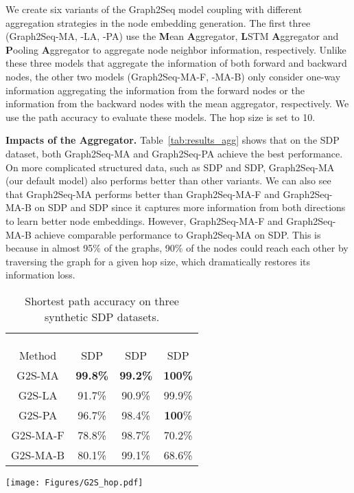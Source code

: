 \documentclass{article} \usepackage{iclr2019_conference,times}
\begin{document}
We create six variants of the Graph2Seq model coupling with different aggregation strategies in the node embedding generation. The first three (Graph2Seq-MA, -LA, -PA) use the \textbf{M}ean \textbf{A}ggregator, \textbf{L}STM \textbf{A}ggregator and \textbf{P}ooling \textbf{A}ggregator
to aggregate node neighbor information, respectively.
Unlike these three models that aggregate the information of both forward and backward nodes,
the other two models (Graph2Seq-MA-F, -MA-B) only consider one-way information aggregating the information from the forward nodes or the information from the backward nodes with the mean aggregator, respectively. We use the path accuracy to evaluate these models. The hop size is set to 10. 

\textbf{Impacts of the Aggregator.} Table~\ref{tab:results_agg} shows that on the SDP dataset, both Graph2Seq-MA and Graph2Seq-PA achieve the best performance.
On more complicated structured data, such as SDP and SDP, Graph2Seq-MA (our default model) also performs better than other variants.
We can also see that Graph2Seq-MA performs better than Graph2Seq-MA-F and Graph2Seq-MA-B on SDP and SDP since it captures more information from both directions to learn better node embeddings. However, Graph2Seq-MA-F and Graph2Seq-MA-B achieve comparable performance to Graph2Seq-MA on SDP. This is because in almost 95\% of the graphs, 90\% of the nodes could reach each other by traversing the graph for a given hop size, which dramatically restores its information loss.





\begin{table}[t!]
    \begin{minipage}[t]{0.5\linewidth}
     \vspace{0pt}
    \centering
    \small
    \begin{tabular}{cccc}
    \\\\\\\\
    Method & SDP & SDP & SDP \\
\hline
    G2S-MA & \textbf{99.8\%} & \textbf{99.2\%} & \textbf{100\%} \\
    G2S-LA & 91.7\% & 90.9\% & 99.9\% \\
    G2S-PA & 96.7\% & 98.4\% & \textbf{100}\%  \\
    \hline
    G2S-MA-F & 78.8\% & 98.7\% & 70.2\% \\
    G2S-MA-B & 80.1\% & 99.1\% & 68.6\% \\
    \hline
\end{tabular}
    \caption{Shortest path accuracy on three synthetic SDP datasets.}
    \label{tab:results_agg}
  \end{minipage}
  \begin{minipage}[t]{0.5\linewidth}
    \vspace{0pt}
    \centering\texttt{[image: Figures/G2S\_hop.pdf]}
    \label{tab:results_hop_function}
  \end{minipage}
  \vspace{-0.8cm}
\end{table}
\end{document}
